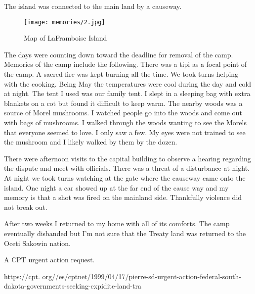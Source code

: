 The island was connected to the main land by a causeway.

\begin{figure}
\centering
\texttt{[image: memories/2.jpg]}
\caption{
Map of LaFramboise Island
}
\end{figure}

The days were counting down toward the deadline for removal of the camp.
Memories of the camp include the following.
There was a tipi as a focal point of the camp.
A sacred fire was kept burning all the time.
We took turns helping with the cooking.
Being May the temperatures were cool during the day and cold at night.
The tent I used was our family tent.
I slept in a sleeping bag with extra blankets on a cot but found it difficult to keep warm.
The nearby woods was a source of Morel mushrooms.
I watched people go into the woods and come out with bags of mushrooms.
I walked through the woods wanting to see the Morels that everyone seemed to love.
I only saw a few.
My eyes were not trained to see the mushroom and I likely walked by them by the dozen.

There were afternoon visits to the capital building to observe a hearing regarding the dispute and meet with officials.
There was a threat of a disturbance at night.
At night we took turns watching at the gate where the causeway came onto the island.
One night a car showed up at the far end of the cause way and my memory is that a shot was fired on the mainland side.
Thankfully violence did not break out.

After two weeks I returned to my home with all of its comforts.
The camp eventually disbanded but I'm not sure that the Treaty land was returned to the Oceti Sakowin nation.

A CPT urgent action request.

https://cpt.
org//es/cptnet/1999/04/17/pierre-sd-urgent-action-federal-south-dakota-governments-seeking-expidite-land-tra





